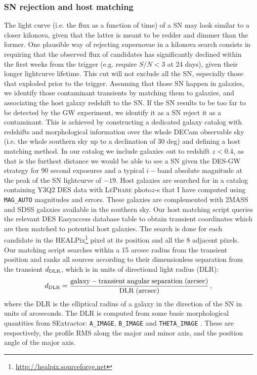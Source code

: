 \subsubsection{SN rejection and host matching}
The light curve (i.e. the flux as a function of time) of a SN may look similar to a closer kilonova, given that the latter is meant to be redder and dimmer than the former. One plausible way of rejecting supernovae in a kilonova search consists in requiring that the observed flux of candidates has significantly declined within 
the first weeks from the trigger (e.g. \citealt{marcelle16} require $S/N<3$ at 24 days), given their longer lightcurve lifetime. This cut will not exclude all the SN, especially those that exploded prior to the trigger. Assuming that those SN happen in galaxies, we identify those contaminant transients by matching them to galaxies, and associating the host galaxy redshift to the SN. If the SN results to be too far to be detected by the GW experiment, we identify it as a SN reject it as a contaminant. This is achieved by constructing a dedicated galaxy catalog with redshifts and morphological information over the whole DECam observable sky (i.e. the whole southern sky up to a declination of 30 deg) and defining a host matching method. 
In our catalog we include galaxies out to redshift $z<0.4$, as that is the furthest distance we would be able to see a SN given the DES-GW strategy for 90 second exposures and a typical $i-$band absolute magnitude at the peak of the SN lightcurve of $-19$.
Host galaxies are searched for in a catalog containing Y3Q2 DES data with \textsc{LePhare} photo$z$-s that I have computed using \texttt{MAG\_AUTO} magnitudes and errors. These galaxies are complemented with 2MASS and SDSS galaxies available in the southern sky. Our host matching script queries the relevant DES Easyaccess database table to obtain transient coordinates which are then matched to potential host galaxies. 
The search is done for each candidate in the HEALPix\footnote{\url{http://healpix.sourceforge.net}} pixel at its position and all the 8 adjacent pixels. Our matching script searches within a 15 arcsec radius from the transient position and ranks all sources according to their dimensionless separation from the transient $d_{\rm DLR}$, which is in units of directional light radius (DLR):
\begin{equation}
d_{\rm DLR}= \frac{\rm galaxy-transient \; angular \; separation\; (arcsec)}{\rm DLR \;(arcsec)}\, ,
\end{equation}
where the DLR is the elliptical radius of a galaxy in the direction of the SN in units of arcseconds. The DLR is computed from some basic morphological quantities from SExtractor: \texttt{A\_IMAGE}, \texttt{B\_IMAGE} and \texttt{THETA\_IMAGE} . These are respectively, the profile RMS along the major and minor axis, and the position angle of the major axis. 

